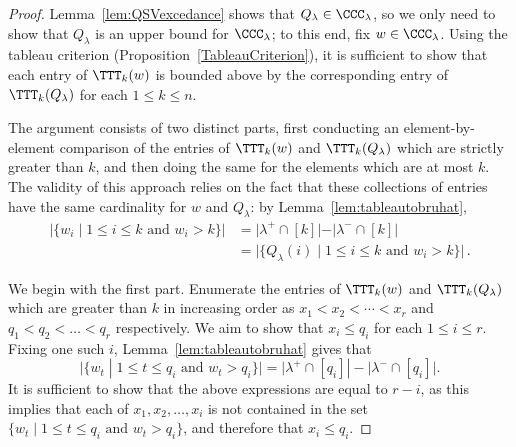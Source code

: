 \documentclass[12pt]{amsart}
\theoremstyle{definition}
\theoremstyle{remark}
\numberwithin{equation}{section}
\begin{document}
\begin{proof}
Lemma~\ref{lem:QSVexcedance} shows that $Q_{\lambda} \in \CCC_{\lambda}$, so we only need to show that $Q_{\lambda}$ is an upper bound for $\CCC_{\lambda}$; to this end, fix $w \in \CCC_{\lambda}$.  Using the tableau criterion (Proposition~\ref{TableauCriterion}), it is sufficient to show that each entry of $\TTT_{k}(w)$ is bounded above by the corresponding entry of $\TTT_{k}(Q_{\lambda})$ for each $1 \le k \le n$.

The argument consists of two distinct parts, first conducting an element-by-element comparison of the entries of $\TTT_{k}(w)$ and $\TTT_{k}(Q_{\lambda})$ which are strictly greater than $k$, and then doing the same for the elements which are at most $k$.  The validity of this approach relies on the fact that these collections of entries have the same cardinality for $w$ and $Q_{\lambda}$: by Lemma~\ref{lem:tableautobruhat}, 
\begin{align*}
\big|\{ w_{i} \;|\; \text{$1 \le i \le k$ and $w_{i} > k$}\}\big|
&= \big|\lambda^{+} \cap [k]| - |\lambda^{-} \cap [k] \big| \\
&= \big|\{ Q_{\lambda}(i) \;|\; \text{$1 \le i \le k$ and $w_{i} > k$}\}\big|\,.
\end{align*}

We begin with the first part.  Enumerate the entries of $\TTT_{k}(w)$ and $\TTT_{k}(Q_{\lambda})$ which are greater than $k$ in increasing order as $x_{1} < x_{2} < \cdots <  x_{r}$ and $q_{1} < q_{2} < \ldots < q_{r}$ respectively.  We aim to show that $x_{i} \le q_{i}$ for each $1 \le i \le r$.  
Fixing one such $i$, Lemma~\ref{lem:tableautobruhat} gives that
\[
\big|\{ w_{t} \;|\; \text{$1 \le t \le q_{i}$ and $w_{t} > q_{i}$} \}\big| = \big|\lambda^{+} \cap [q_{i}]| - |\lambda^{-} \cap [q_{i}]\big|.
\]
It is sufficient to show that the above expressions are equal to $r - i$, as this implies that each of $x_{1}, x_{2}, \ldots, x_{i}$ is not contained in the set $\{ w_{t} \;|\; \text{$1 \le t \le q_{i}$ and $w_{t} > q_{i}$} \}$, and therefore that $x_{i} \le q_{i}$.


\end{proof}
\end{document}
